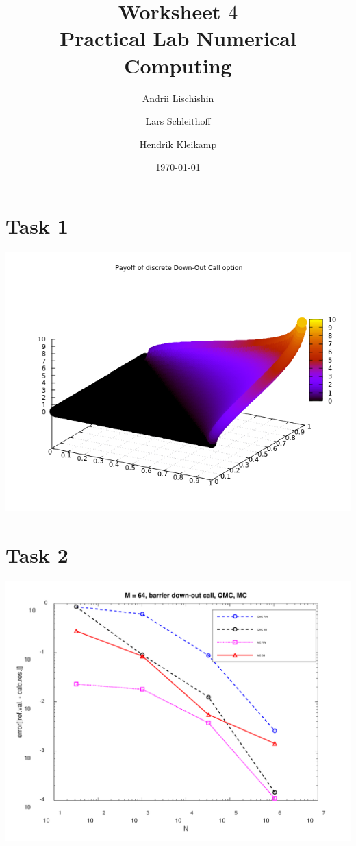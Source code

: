 \documentclass[10pt,a4paper]{article}
\begin{document}
\title{Worksheet $4$\\
\small{Practical Lab Numerical Computing}}
\author{Andrii Lischishin \and Lars Schleithoff \and Hendrik Kleikamp}
\date{\today}
\maketitle

\section*{Task 1}

\begin{center}
	\includegraphics[scale=0.7]{payoff_down_out_call.png}
\end{center}

\section*{Task 2}


\begin{center}
	\includegraphics[scale=0.25]{images/task2_error.png}
\end{center}
\end{document}
